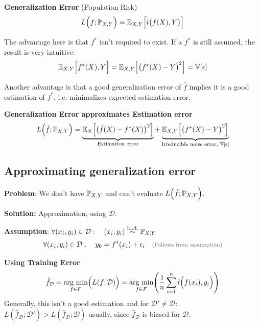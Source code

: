  \textbf{Generalization Error} (Population Risk)\\
$$
    L\Bigl( f;\P_{X,Y} \Bigr) = \E_{X,Y}\Bigl[ l\bigl(f(X), Y\bigr) \Bigr]
$$

The advantage here is that $f^*$ isn't required to exist. If a $f^*$ is still assumed, the result is very intuitive:
$$
    \E_{X,Y}\Bigl[ f^*(X),Y \Bigr] = \E_{X,Y}\Bigl[ \bigl(f^*(X) - Y\bigr)^2 \Bigr] = \V[\epsilon]
$$

Another advantage is that a good generalization error of $\hat{f}$ implies it is a good estimation of $f^*$, i.e. minimalizes expected estimation error.

\lemma \textbf{Generalization Error approximates Estimation error}\\
$$
    L\Bigl( \hat{f}; \P_{X,Y}\Bigr) = \underbrace{\E_X\Bigl[ \bigl(\hat{f}(X)-f^*(X)\bigr)^2 \Bigr]}_\text{Estimation error} + \underbrace{\E_{X,Y}\Bigl[ \bigl(f^*(X)-Y\bigr)^2 \Bigr]}_\text{Irreducible noise error, $\V[\epsilon]$}
$$

\subsection{Approximating generalization error}

\textbf{Problem}: We don't have $\P_{X,Y}$ and can't evaluate $L\Bigl(\hat{f};\P_{X,Y}\Bigr)$.

\textbf{Solution:} Approximation, using $\mathcal{D}$.

\textbf{Assumption}: $\forall (x_i,y_i) \in \mathcal{D}:\quad (x_i,y_i) \overset{\text{i.i.d.}}{\sim} \P_{X,Y}$\\
$$
    \forall (x_i,y_i) \in \mathcal{D}:\quad y_0 = f^*(x_i) + \epsilon_i \quad \text{\footnotesize\color{gray} (Follows from assumption)}
$$

\method \textbf{Using Training Error}\\
$$
    \hat{f}_\mathcal{D} = \underset{f\in F}{\text{arg min}}\Bigl( L(f;\mathcal{D}) \Bigr) = \underset{f\in F}{\text{arg min}}\Biggl( \frac{1}{n}\sum_{i=1}^{n}l\Bigl(f(x_i), y_i\Bigr) \Biggr)
$$
Generally, this isn't a good estimation and for $\mathcal{D}' \neq \mathcal{D}$:\\
$L(\hat{f}_\mathcal{D};\mathcal{D}') > L(\hat{f}_\mathcal{D};\mathcal{D})$ usually, since $\hat{f}_\mathcal{D}$ is biased for $\mathcal{D}$.


